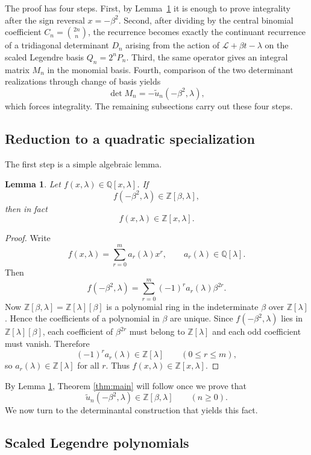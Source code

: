 \documentclass[11pt,letterpaper]{amsart}
\numberwithin{equation}{section}
\theoremstyle{plain}
\newtheorem{lemma}[theorem]{Lemma}
\theoremstyle{remark}
\newcommand{\Z}{\mathbb{Z}}
\newcommand{\Q}{\mathbb{Q}}
\begin{document}
The proof has four steps. First, by Lemma~\ref{lem:beta-substitution} it is enough to prove
integrality after the sign reversal \(x=-\beta^2\). Second, after dividing by the central
binomial coefficient \(C_n=\binom{2n}{n}\), the recurrence becomes exactly the continuant
recurrence of a tridiagonal determinant \(D_n\) arising from the action of
\(\mathcal L+\beta t-\lambda\) on the scaled Legendre basis \(Q_n=2^nP_n\). Third, the same
operator gives an integral matrix \(M_n\) in the monomial basis. Fourth, comparison of the
two determinant realizations through change of basis yields
\[
\det M_n=-\widetilde u_n(-\beta^2,\lambda),
\]
which forces integrality. The remaining subsections carry out these four steps.

\subsection{Reduction to a quadratic specialization}

The first step is a simple algebraic lemma.

\begin{lemma}\label{lem:beta-substitution}
Let $f(x,\lambda)\in \Q[x,\lambda]$. If
\[
 f(-\beta^2,\lambda)\in \Z[\beta,\lambda],
\]
then in fact
\[
 f(x,\lambda)\in \Z[x,\lambda].
\]
\end{lemma}

\begin{proof}
Write
\[
 f(x,\lambda)=\sum_{r=0}^m a_r(\lambda)x^r,
 \qquad a_r(\lambda)\in \Q[\lambda].
\]
Then
\[
 f(-\beta^2,\lambda)=\sum_{r=0}^m (-1)^r a_r(\lambda)\beta^{2r}.
\]
Now $\Z[\beta,\lambda]=\Z[\lambda][\beta]$ is a polynomial ring in the indeterminate $\beta$ over $\Z[\lambda]$. Hence the coefficients of a polynomial in $\beta$ are unique. Since $f(-\beta^2,\lambda)$ lies in $\Z[\lambda][\beta]$, each coefficient of $\beta^{2r}$ must belong to $\Z[\lambda]$ and each odd coefficient must vanish. Therefore
\[
 (-1)^r a_r(\lambda)\in \Z[\lambda]
 \qquad(0\le r\le m),
\]
so $a_r(\lambda)\in \Z[\lambda]$ for all $r$. Thus $f(x,\lambda)\in \Z[x,\lambda]$.
\end{proof}

By Lemma \ref{lem:beta-substitution}, Theorem \ref{thm:main} will follow once we prove that
\[
 \widetilde u_n(-\beta^2,\lambda)\in \Z[\beta,\lambda]
 \qquad(n\ge 0).
\]
We now turn to the determinantal construction that yields this fact.

\subsection{Scaled Legendre polynomials}
\end{document}

